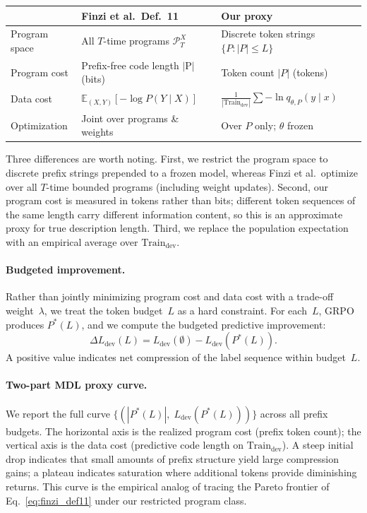 \documentclass[preprint]{article}
\newcommand{\Ldev}{L_{\text{dev}}}
\newcommand{\Traindev}{\text{Train}_{\text{dev}}}
\begin{document}
\begin{center}
\footnotesize
\begin{tabular}{@{}lp{3.6cm}p{4.0cm}@{}}
\toprule
& \textbf{Finzi et al.\ Def.~11} & \textbf{Our proxy} \\
\midrule
Program space & All $T$-time programs $\mathcal{P}^X_T$ & Discrete token strings $\{P : |P| \leq L\}$ \\[2pt]
Program cost & Prefix-free code length $|\mathrm{P}|$ (bits) & Token count $|P|$ (tokens) \\[2pt]
Data cost & $\mathbb{E}_{(X,Y)}[-\log P(Y {\mid} X)]$ & $\frac{1}{|\Traindev|}\!\sum -\ln q_{\theta,P}(y {\mid} x)$ \\[2pt]
Optimization & Joint over programs \& weights & Over $P$ only; $\theta$ frozen \\
\bottomrule
\end{tabular}
\end{center}

\noindent
Three differences are worth noting.
First, we restrict the program space to discrete prefix strings prepended to a frozen model, whereas Finzi et al.\ optimize over all $T$-time bounded programs (including weight updates).
Second, our program cost is measured in tokens rather than bits; different token sequences of the same length carry different information content, so this is an approximate proxy for true description length.
Third, we replace the population expectation with an empirical average over $\Traindev$.

\paragraph{Budgeted improvement.}
Rather than jointly minimizing program cost and data cost with a trade-off weight~$\lambda$, we treat the token budget~$L$ as a hard constraint.
For each~$L$, GRPO produces $P^*(L)$, and we compute the budgeted predictive improvement:
\begin{equation}
\Delta\Ldev(L) = \Ldev(\emptyset) - \Ldev(P^*(L)).
\label{eq:delta_ldev}
\end{equation}
A positive value indicates net compression of the label sequence within budget~$L$.

\paragraph{Two-part MDL proxy curve.}
We report the full curve $\{(|P^*(L)|, \;\Ldev(P^*(L)))\}$ across all prefix budgets.
The horizontal axis is the realized program cost (prefix token count); the vertical axis is the data cost (predictive code length on $\Traindev$).
A steep initial drop indicates that small amounts of prefix structure yield large compression gains; a plateau indicates saturation where additional tokens provide diminishing returns.
This curve is the empirical analog of tracing the Pareto frontier of Eq.~\ref{eq:finzi_def11} under our restricted program class.
\end{document}
